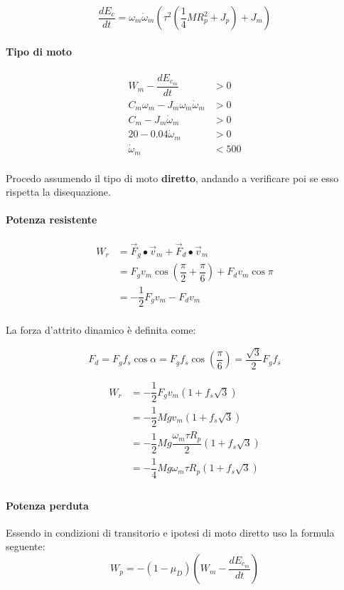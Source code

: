 \documentclass[main.tex]{subfiles}
\begin{document}
\[
\dfrac{dE_c}{dt} =  \omega_m\dot{\omega}_m(\tau^2(\dfrac{1}{4}M R_p^2 + J_p) +  J_m)
\]

\paragraph{Tipo di moto}

\begin{align*}
	W_m - \dfrac{dE_{c_m}}{dt} &> 0\\
	C_m\omega_m -J_m\omega_m\dot{\omega}_m &> 0\\
	C_m -J_m\dot{\omega}_m &> 0\\
	20 -0.04\dot{\omega}_m &> 0\\
	\dot{\omega}_m &< 500\\
\end{align*}

Procedo assumendo il tipo di moto \textbf{diretto}, andando a verificare poi se esso rispetta la disequazione.

\paragraph{Potenza resistente}

\begin{align*}
	W_r &= \vec{F}_g\bullet\vec{v}_m + \vec{F}_d\bullet\vec{v}_m \\
	       &= F_gv_m\cos\left ( \dfrac{\pi}{2} + \dfrac{\pi}{6} \right ) + F_dv_m\cos\pi \\
	       &= -\dfrac{1}{2}F_gv_m - F_dv_m \\
\end{align*}

La forza d'attrito dinamico è definita come:

\[
	F_d = F_gf_s\cos\alpha = F_gf_s\cos\left ( \dfrac{\pi}{6} \right ) = \dfrac{\sqrt{3}}{2}F_gf_s
\]

\begin{align*}
	W_r &= -\dfrac{1}{2}F_gv_m(1+f_s\sqrt{3}) \\
		   &= -\dfrac{1}{2}Mgv_m(1+f_s\sqrt{3}) \\
		   &= -\dfrac{1}{2}Mg\dfrac{\omega_m \tau R_p}{2}(1+f_s\sqrt{3}) \\
		   &= -\dfrac{1}{4}Mg\omega_m \tau R_p(1+f_s\sqrt{3}) \\
\end{align*}

\paragraph{Potenza perduta} Essendo in condizioni di transitorio e ipotesi di moto diretto uso la formula seguente:
\[
	W_p =  -(1-\mu_D)(W_m - \dfrac{dE_{c_m}}{dt})
\]
\end{document}
